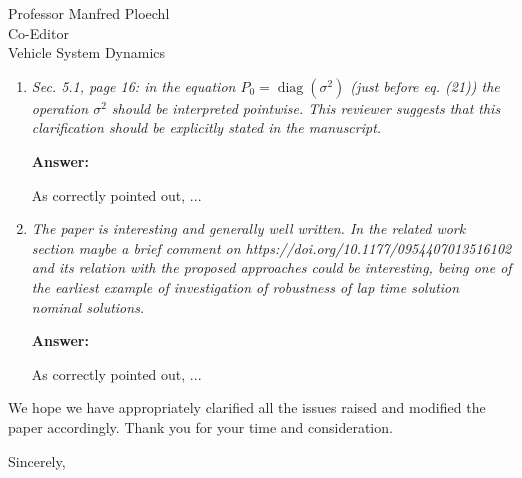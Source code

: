 \documentclass{letter}
\renewcommand\ul[1]{#1} %
\DeclareMathOperator{\diag}{diag}
\begin{document}
\begin{letter}{Professor Manfred Ploechl\\
Co-Editor\\
Vehicle System Dynamics}
\begin{enumerate}
\textbf{Answer:}

We appreciate the reviewer's request \ul{for more details on these technical aspects.} 

\hrulefill

\item
\textit{Sec. 5.1, page 16: in the equation $P_0=\diag(\sigma^2)$ (just before eq. (21)) the operation $\sigma^2$ should be interpreted pointwise. This reviewer suggests that this clarification should be explicitly stated in the manuscript.}

\vspace{2mm}

\textbf{Answer:}

As correctly pointed out, ...



\hrulefill

\item
\textit{The paper is interesting and generally well written. In the related work section maybe a brief comment on https://doi.org/10.1177/0954407013516102 and its relation with the proposed approaches could be interesting, being one of the earliest example of investigation of robustness of lap time solution nominal solutions.}

\vspace{2mm}

\textbf{Answer:}

 As correctly pointed out, ... 

\hrulefill
 
\end{enumerate}

We hope we have appropriately clarified all the issues raised and modified the paper accordingly. Thank you for your time and consideration.


\vspace{2\parskip} %
\closing{Sincerely,}
\vspace{2\parskip} %



\end{letter}
\end{document}
